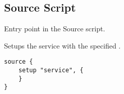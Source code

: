 \subsection{Source Script}



Entry point in the Source script.


Setups the service with the specified .

\begin{lstlisting}[style=Java]
source {
    setup "service", {
    }
}
\end{lstlisting}


